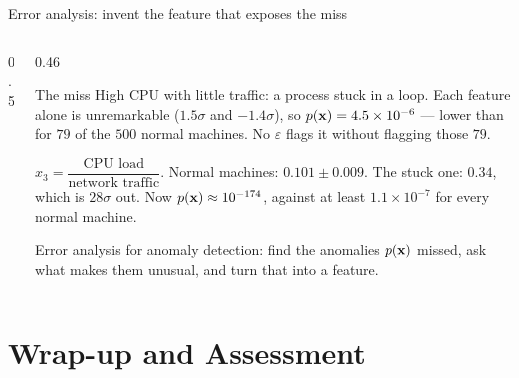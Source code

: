 \documentclass[aspectratio=169,10pt]{beamer}
\begin{document}
\begin{frame}{Error analysis: invent the feature that exposes the miss}
\begin{columns}[T,onlytextwidth]
\begin{column}{0.5\textwidth}
    \end{column}
    \begin{column}{0.46\textwidth}
      \footnotesize
      \begin{block}{The miss}
        High CPU with little traffic: a process stuck in a loop. Each feature alone is
        unremarkable ($1.5\sigma$ and $-1.4\sigma$), so $p(\mathbf{x})=4.5\times10^{-6}$ --- lower
        than for $79$ of the $500$ normal machines. No $\varepsilon$ flags it without
        flagging those $79$.
      \end{block}
      \begin{keyidea}
        $x_3=\dfrac{\text{CPU load}}{\text{network traffic}}$. Normal machines:
        $0.101\pm0.009$. The stuck one: $0.34$, which is $28\sigma$ out. Now
        $p(\mathbf{x})\approx10^{-174}$, against at least $1.1\times10^{-7}$ for every normal
        machine.
      \end{keyidea}
      Error analysis for anomaly detection: find the anomalies $p(\mathbf{x})$ missed, ask what
      makes them unusual, and turn that into a feature.
    \end{column}
  \end{columns}
\end{frame}

\section{Wrap-up and Assessment}
\end{document}
